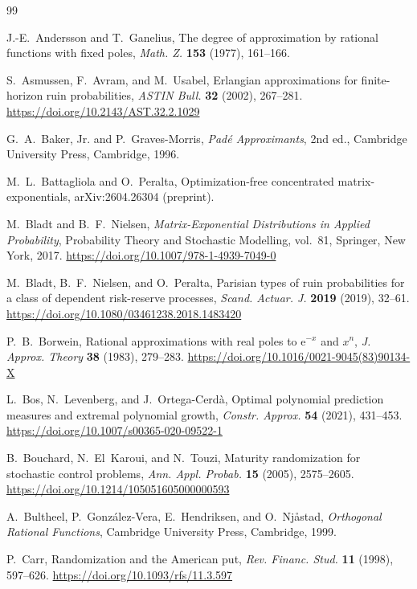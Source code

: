\documentclass[11pt]{article}
\numberwithin{equation}{section}
\theoremstyle{definition}
\theoremstyle{remark}
\newcommand{\e}{\mathrm e}
\begin{document}
\begin{thebibliography}{99}

J.-E.~Andersson and T.~Ganelius,
The degree of approximation by rational functions with fixed poles,
\emph{Math. Z.} \textbf{153} (1977), 161--166.


S.~Asmussen, F.~Avram, and M.~Usabel,
Erlangian approximations for finite-horizon ruin probabilities,
\emph{ASTIN Bull.} \textbf{32} (2002), 267--281.
\url{https://doi.org/10.2143/AST.32.2.1029}

G.~A.~Baker, Jr. and P.~Graves-Morris,
\emph{Pad\'e Approximants}, 2nd ed.,
Cambridge University Press, Cambridge, 1996.

M.~L.~Battagliola and O.~Peralta,
Optimization-free concentrated matrix-exponentials,
arXiv:2604.26304 (preprint).


M.~Bladt and B.~F.~Nielsen,
\emph{Matrix-Exponential Distributions in Applied Probability},
Probability Theory and Stochastic Modelling, vol.~81,
Springer, New York, 2017.
\url{https://doi.org/10.1007/978-1-4939-7049-0}


M.~Bladt, B.~F.~Nielsen, and O.~Peralta,
Parisian types of ruin probabilities for a class of dependent risk-reserve
processes,
\emph{Scand. Actuar. J.} \textbf{2019} (2019), 32--61.
\url{https://doi.org/10.1080/03461238.2018.1483420}


P.~B.~Borwein,
Rational approximations with real poles to $\e^{-x}$ and $x^n$,
\emph{J. Approx. Theory} \textbf{38} (1983), 279--283.
\url{https://doi.org/10.1016/0021-9045(83)90134-X}


L.~Bos, N.~Levenberg, and J.~Ortega-Cerd\`a,
Optimal polynomial prediction measures and extremal polynomial growth,
\emph{Constr. Approx.} \textbf{54} (2021), 431--453.
\url{https://doi.org/10.1007/s00365-020-09522-1}

B.~Bouchard, N.~El~Karoui, and N.~Touzi,
Maturity randomization for stochastic control problems,
\emph{Ann. Appl. Probab.} \textbf{15} (2005), 2575--2605.
\url{https://doi.org/10.1214/105051605000000593}

A.~Bultheel, P.~Gonz\'alez-Vera, E.~Hendriksen, and O.~Nj{\aa}stad,
\emph{Orthogonal Rational Functions},
Cambridge University Press, Cambridge, 1999.

P.~Carr,
Randomization and the American put,
\emph{Rev. Financ. Stud.} \textbf{11} (1998), 597--626.
\url{https://doi.org/10.1093/rfs/11.3.597}


\end{thebibliography}
\end{document}

